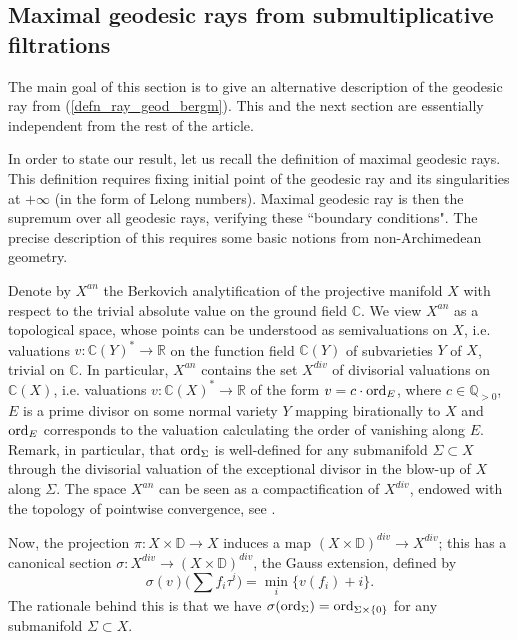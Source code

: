 \documentclass[12pt]{article}
\numberwithin{equation}{section}
\theoremstyle{theorem}
\theoremstyle{definition}
\theoremstyle{remark}
\newcommand{\comp}{\mathbb{C}}
\newcommand{\real}{\mathbb{R}}
\begin{document}
	\subsection{Maximal geodesic rays from submultiplicative filtrations}\label{sec_spec_meas}
	The main goal of this section is to give an alternative description of the geodesic ray from (\ref{defn_ray_geod_bergm}).
	This and the next section are essentially independent from the rest of the article.
	\par 
	In order to state our result, let us recall the definition of maximal geodesic rays.
	This definition requires fixing initial point of the geodesic ray and its singularities at $+\infty$ (in the form of Lelong numbers).
	Maximal geodesic ray is then the supremum over all geodesic rays, verifying these “boundary conditions".
	The precise description of this requires some basic notions from non-Archimedean geometry.
	\par 
	Denote by $X^{an}$ the Berkovich analytification of the projective manifold $X$ with respect to the trivial absolute value on the ground field $\comp$. 
	We view $X^{an}$ as a topological space, whose points can be understood as semivaluations on $X$, i.e. valuations $v : \comp(Y)^* \to \real$ on the function field $\comp(Y)$ of subvarieties $Y$ of $X$, trivial on $\comp$. 
	In particular, $X^{an}$ contains the set $X^{div}$ of divisorial valuations on $\comp(X)$, i.e. valuations $v :  \comp(X)^* \to \real$ of the form $v = c \cdot {\rm{ord}}_E$, where $c \in \mathbb{Q}_{> 0}$, $E$ is a prime divisor on some normal variety $Y$ mapping birationally to $X$ and ${\rm{ord}}_E$ corresponds to the valuation calculating the order of vanishing along $E$.
	Remark, in particular, that ${\rm{ord}}_{\Sigma}$ is well-defined for any submanifold $\Sigma \subset X$ through the divisorial valuation of the exceptional divisor in the blow-up of $X$ along $\Sigma$.
	The space $X^{an}$ can be seen as a compactification of $X^{div}$, endowed with the topology of pointwise convergence, see \cite[\S 6.1]{BerBouckJonYTD}.
	\par 
	Now, the projection $\pi: X \times \mathbb{D} \to X$ induces a map $(X \times \mathbb{D})^{div} \to X^{div}$; this has a canonical section $\sigma : X^{div} \to (X \times \mathbb{D})^{div}$, the Gauss extension, defined by 
	\begin{equation}\label{eq_sigm_Gauss}
		\sigma(v)\Big( \sum f_i \tau^i \Big)
		=
		\min_i \{ v(f_i) + i \}.
	\end{equation}
	The rationale behind this is that we have $\sigma({\rm{ord}}_{\Sigma}) = {\rm{ord}}_{\Sigma \times \{0\}}$ for any submanifold $\Sigma \subset X$.
\end{document}
